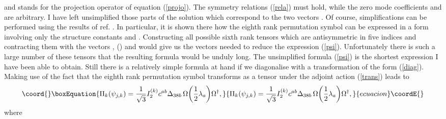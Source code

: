 \documentclass[a4paper,12pt]{article}
\begin{document}
and \coordHE{} stands for the projection operator of equation (\ref{projo}). The symmetry relations (\ref{rela}) must hold, while the zero mode coefficients \coordHE{} and \coordHE{} are arbitrary. I have left unsimplified those parts of the solution which correspond to the two vectors \coordHE{}. Of course, simplifications can be performed using the results of ref. \cite{ammp}. In particular, it is shown there how the eighth rank permutation symbol can be expressed in a form involving only the structure constants \coordHE{} and \coordHE{}. Constructing all possible sixth rank tensors which are antisymmetric in five indices and contracting them with the vectors \coordHE{}, \coordHE{} (\coordHE{}) and \coordHE{} would give us the vectors needed to reduce the expression (\ref{psi}). Unfortunately there is such a large number of these tensors that the resulting formula would be unduly long. The unsimplified formula (\ref{psi}) is the shortest expression I have been able to obtain. Still there is a relatively simple formula at hand if we diagonalise \coordHE{} with a transformation of the form (\ref{diag}). Making use of the fact that the eighth rank permutation symbol transforms as a tensor under the adjoint action (\ref{trans}) leads to
\begin{equation}\coord{}\boxEquation{ \label{sipsi}
\Pi_k (\psi_{j,k}) = \frac{1}{\sqrt{3}} I_2^{(k)} c^{ab} \Delta_{38b} \, \Omega \! \left( \frac{1}{2} \lambda_a \right) \! \Omega^{\dagger},
}{ \Pi_k (\psi_{j,k}) = \frac{1}{\sqrt{3}} I_2^{(k)} c^{ab} \Delta_{38b} \, \Omega \! \left( \frac{1}{2} \lambda_a \right) \! \Omega^{\dagger},
}{ecuacion}\coordE{}\end{equation}
where
\end{document}
